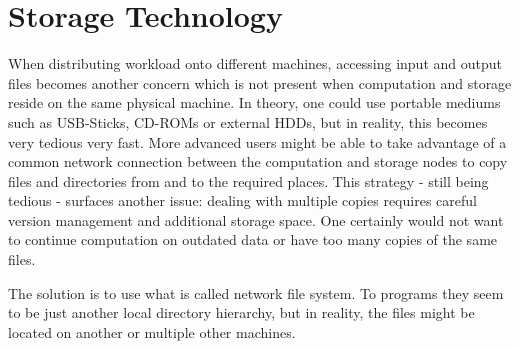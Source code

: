 \section{Storage Technology }

When distributing workload onto different machines, accessing input and output files becomes another concern which is not present when computation and storage reside on the same physical machine.
In theory, one could use portable mediums such as USB-Sticks, CD-ROMs or external HDDs, but in reality, this becomes very tedious very fast.
More advanced users might be able to take advantage of a common network connection between the computation and storage nodes to copy files and directories from and to the required places.
This strategy - still being tedious - surfaces another issue: dealing with multiple copies requires careful version management and additional storage space.
One certainly would not want to continue computation on outdated data or have too many copies of the same files.

The solution is to use what is called network file system. 
To programs they seem to be just another local directory hierarchy, but in reality, the files might be located on another or multiple other machines.

